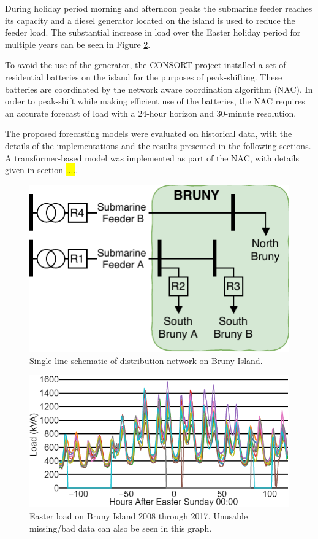 During holiday period morning and afternoon peaks the submarine feeder reaches its capacity and a diesel generator located on the island is used to reduce the feeder load.
The substantial increase in load over the Easter holiday period for multiple years can be seen in Figure \ref{fig:bruny_easter}.

To avoid the use of the generator, the CONSORT project installed a set of residential batteries on the island for the purposes of peak-shifting.
These batteries are coordinated by the network aware coordination algorithm (NAC).
In order to peak-shift while making efficient use of the batteries, the NAC requires an accurate forecast of load with a 24-hour horizon and 30-minute resolution.

The proposed forecasting models were evaluated on historical data, with the details of the implementations and the results presented in the following sections.
A transformer-based model was implemented as part of the NAC, with details given in section \hl{....}.

\begin{figure}[htbp]
	\centerline{\includegraphics[width=.45\textwidth]{images/bruny_single_line.pdf}}
	\caption{Single line schematic of distribution network on Bruny Island.}
	\label{fig:bruny_network}
\end{figure}

\begin{figure}[htbp]
	\centerline{\includegraphics[width=.65\textwidth]{images/easter_bruny.png}}
	\caption{Easter load on Bruny Island 2008 through 2017.
		Unusable missing/bad data can also be seen in this graph.}
	\label{fig:bruny_easter}
\end{figure}

